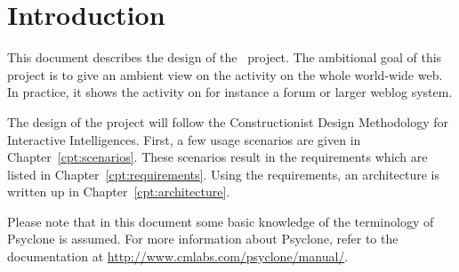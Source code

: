 \chapter{Introduction}

This document describes the design of the \AmbE\ project. The ambitional goal
of this project is to give an ambient view on the activity on the whole
world-wide web. In practice, it shows the activity on for instance a forum or
larger weblog system.

The design of the project will follow the Constructionist Design Methodology
for Interactive Intelligences\cite{CDM}. First, a few usage scenarios are given
in Chapter~\ref{cpt:scenarios}. These scenarios result in the requirements
which are listed in Chapter~\ref{cpt:requirements}. Using the requirements, an
architecture is written up in Chapter~\ref{cpt:architecture}.

Please note that in this document some basic knowledge of the terminology of
Psyclone is assumed. For more information about Psyclone, refer to the
documentation at \url{http://www.cmlabs.com/psyclone/manual/}.

